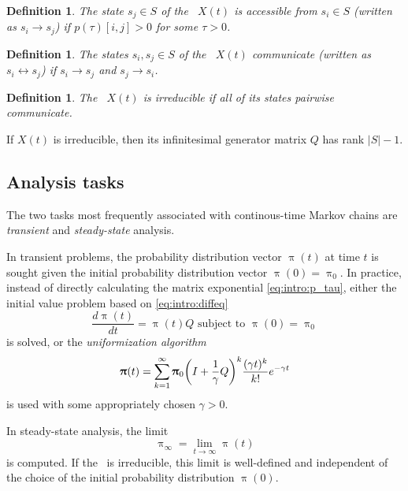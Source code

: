 \documentclass[a4paper,11pt,twoside,openright]{memoir}
\renewcommand*{\vec}[1]{\boldsymbol{\mathrm{#1}}}
\newcommand*{\textabbrev}[1]{\textls[50]{\textsc{#1}}}
\newcommand*{\ctmc}{\textabbrev{ctmc}}
\newcommand{\paren}[1]{\textup(#1\textup)}
\theoremstyle{my}
\newtheorem{dfn}[thm]{Definition}
\begin{document}
\begin{dfn}
  The state $s_j \in S$ of the \ctmc\ $X(t)$ is \emph{accessible} from
  $s_i \in S$ \paren{written as $s_i \to s_j$} if $p(\tau)[i, j] > 0$ for
  some $\tau > 0$.
\end{dfn}

\begin{dfn}
  The states $s_i, s_j \in S$ of the \ctmc\ $X(t)$ \emph{communicate}
  \paren{written as $s_i \leftrightarrow s_j$} if $s_i \to s_j$ and
  $s_j \to s_i$.
\end{dfn}

\begin{dfn}
  The \ctmc\ $X(t)$ is \emph{irreducible} if all of its states pairwise
  communicate.
\end{dfn}

If $X(t)$ is irreducible, then its infinitesimal generator matrix $Q$
has rank $\lvert S \rvert - 1$.

\subsection{Analysis tasks}

The two tasks most frequently associated with continous-time Markov
chains are \emph{transient} and \emph{steady-state} analysis.

In transient problems, the probability distribution vector
$\vec{\uppi}(t)$ at time $t$ is sought given the initial probability
distribution vector $\vec{\uppi}(0) = \vec{\uppi}_0$. In practice,
instead of directly calculating the matrix exponential
\eqref{eq:intro:p_tau}, either the initial value problem based on
\eqref{eq:intro:diffeq}
\begin{equation}
  \frac{d \vec{\uppi}(t)}{dt} = \vec{\uppi}(t) Q \text{ subject
    to } \vec{\uppi}(0) = \vec{\uppi}_0
\end{equation}
is solved, or the \emph{uniformization algorithm}
\begin{equation}
  \vec{\uppi}(t) = \sum_{k = 1}^{\infty} \vec{\uppi}_0 \mleft( I +
  \frac{1}{\gamma} Q \mright)^k \frac{(\gamma t)^k}{k!} e^{-\gamma t}
\end{equation}
is used with some appropriately chosen $\gamma > 0$.

In steady-state analysis, the limit
\begin{equation}
  \vec{\uppi}_{\infty} = \lim_{t \to \infty} \vec{\uppi}(t)
\end{equation}
is computed. If the \ctmc\ is irreducible, this limit is well-defined
and independent of the choice of the initial probability distribution
$\vec{\uppi}(0)$.
\end{document}
